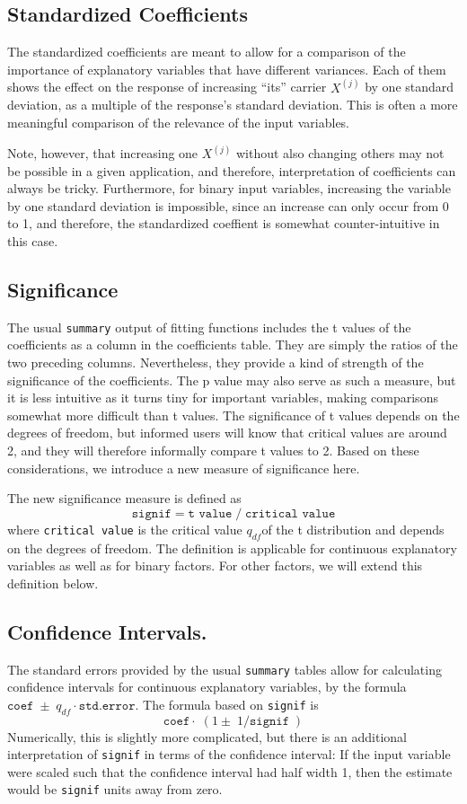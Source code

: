\documentclass{article}
\providecommand{\T}{\texttt}
\begin{document}
\subsection{Standardized Coefficients}
The standardized coefficients are meant to allow for a comparison of the 
importance of explanatory variables that have different variances.
Each of them shows the effect on the response of increasing ``its'' 
carrier $X^{(j)}$ by one standard deviation, as a multiple 
of the response's standard deviation. 
This is often a more meaningful comparison of the relevance of the input
variables. 

Note, however, that increasing one $X^{(j)}$ without also changing
others may not be possible in a given application, and therefore, 
interpretation of coefficients can always be tricky.
Furthermore, for binary input variables, increasing the variable by one
standard deviation is impossible, since an increase can only occur from 0
to 1, and therefore, the standardized coeffient is somewhat 
counter-intuitive in this case.

\subsection{Significance}
The usual \T{summary} output of fitting functions includes the 
t values of the coefficients as a column in the coefficients table. 
They are simply the ratios of the two preceding columns. 
Nevertheless, they provide a kind of strength of the significance of the
coefficients. The p value may also serve as such a measure, but it is less 
intuitive as it turns tiny for important variables, making comparisons
somewhat more difficult than t values. 
The significance of t values depends on the degrees of freedom, but
informed users will know that critical values are around 2, and they will
therefore informally compare t values to 2. 
Based on these considerations, we introduce a new measure of significance
here. 

The new significance measure is defined as
\[
  \T{signif} = \T{t value}\;/\; \T{critical value}
\]
where \T{critical value} is the critical value $q_{df}$of the t distribution 
and depends on the 
degrees of freedom. The definition is applicable for continuous explanatory
variables as well as for binary factors.
For other factors, we will extend this definition below.

\subsection{Confidence Intervals.}
The standard errors provided by the usual \T{summary} tables allow for
calculating confidence intervals for continuous explanatory variables,
by the formula $\T{coef} \;\pm\; q_{df}\cdot\T{std.error}$.
The formula based on \T{signif} is
\[
  \T{coef}\cdot\;(1\pm\;1/\T{signif}\;)
\]
Numerically, this is slightly more complicated, but there is an additional
interpretation of \T{signif} in terms of the confidence interval:
If the input variable were scaled such that the confidence interval had 
half width 1, then the estimate would be \T{signif} units away from zero.
\end{document}
